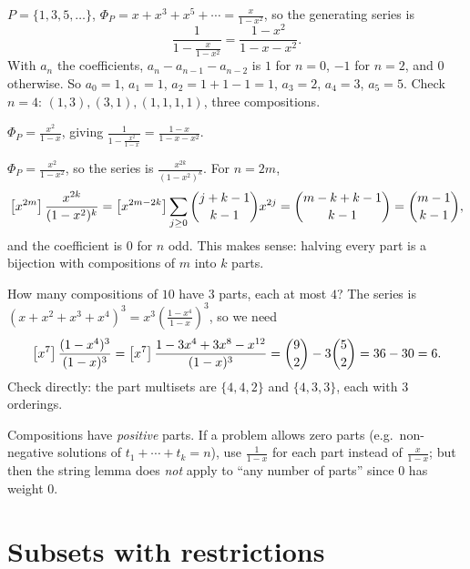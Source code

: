\begin{example}
$P = \{1,3,5,\dots\}$, $\Phi_P = x + x^3 + x^5 + \cdots = \frac{x}{1-x^2}$, so the
generating series is
\[
\frac{1}{1 - \frac{x}{1-x^2}} = \frac{1-x^2}{1 - x - x^2}.
\]
With $a_n$ the coefficients, $a_n - a_{n-1} - a_{n-2}$ is $1$ for $n=0$, $-1$ for $n = 2$,
and $0$ otherwise. So $a_0 = 1$, $a_1 = 1$, $a_2 = 1+1-1 = 1$, $a_3 = 2$, $a_4 = 3$, $a_5 = 5$.
Check $n=4$: $(1,3),(3,1),(1,1,1,1)$, three compositions.
\end{example}

\begin{example}
$\Phi_P = \frac{x^2}{1-x}$, giving $\frac{1}{1 - \frac{x^2}{1-x}} = \frac{1-x}{1-x-x^2}$.
\end{example}

\begin{example}
$\Phi_P = \frac{x^2}{1-x^2}$, so the series is $\frac{x^{2k}}{(1-x^2)^k}$. For $n = 2m$,
\[
\left[x^{2m}\right]\frac{x^{2k}}{(1-x^2)^k} = \left[x^{2m-2k}\right]\sum_{j\ge0}\binom{j+k-1}{k-1}x^{2j}
= \binom{m-k+k-1}{k-1} = \binom{m-1}{k-1},
\]
and the coefficient is $0$ for $n$ odd. This makes sense: halving every part is a bijection
with compositions of $m$ into $k$ parts.
\end{example}

\begin{example}
How many compositions of $10$ have $3$ parts, each at most $4$? The series is
$(x + x^2 + x^3 + x^4)^3 = x^3\left(\frac{1-x^4}{1-x}\right)^3$, so we need
\[
\left[x^{7}\right]\frac{(1-x^4)^3}{(1-x)^3} = \left[x^{7}\right]\frac{1 - 3x^4 + 3x^8 - x^{12}}{(1-x)^3}
= \binom{9}{2} - 3\binom{5}{2} = 36 - 30 = 6.
\]
Check directly: the part multisets are $\{4,4,2\}$ and $\{4,3,3\}$, each with $3$ orderings.
\end{example}

\begin{important}
Compositions have \emph{positive} parts. If a problem allows zero parts (e.g.\ non-negative
solutions of $t_1 + \cdots + t_k = n$), use $\frac{1}{1-x}$ for each part instead of
$\frac{x}{1-x}$; but then the string lemma does \emph{not} apply to ``any number of parts''
since $0$ has weight $0$.
\end{important}

\section{Subsets with restrictions}

